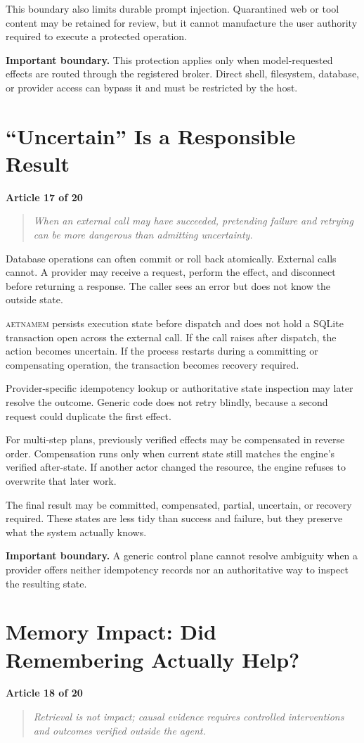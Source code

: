 \documentclass[11pt]{article}
\newcommand{\system}{\textsc{aetnamem}}
\newcommand{\articlelabel}[1]{%
  \noindent\colorbox{aetnaTeal!10}{%
    \parbox{0.96\textwidth}{\color{aetnaInk}\small\textbf{Article #1 of 20}}}%
  \par\medskip}
\newcommand{\coreidea}[1]{%
  \begin{quote}\color{aetnaTeal}\large\itshape #1\end{quote}}
\newcommand{\boundary}[1]{%
  \par\smallskip\noindent\textbf{Important boundary.} #1}
\begin{document}
This boundary also limits durable prompt injection. Quarantined web or tool
content may be retained for review, but it cannot manufacture the user
authority required to execute a protected operation.

\boundary{This protection applies only when model-requested effects are routed
through the registered broker. Direct shell, filesystem, database, or provider
access can bypass it and must be restricted by the host.}

\clearpage
\section{``Uncertain'' Is a Responsible Result}
\articlelabel{17}
\coreidea{When an external call may have succeeded, pretending failure and
retrying can be more dangerous than admitting uncertainty.}

Database operations can often commit or roll back atomically. External calls
cannot. A provider may receive a request, perform the effect, and disconnect
before returning a response. The caller sees an error but does not know the
outside state.

\system{} persists execution state before dispatch and does not hold a SQLite
transaction open across the external call. If the call raises after dispatch,
the action becomes uncertain. If the process restarts during a committing or
compensating operation, the transaction becomes recovery required.

Provider-specific idempotency lookup or authoritative state inspection may
later resolve the outcome. Generic code does not retry blindly, because a
second request could duplicate the first effect.

For multi-step plans, previously verified effects may be compensated in
reverse order. Compensation runs only when current state still matches the
engine's verified after-state. If another actor changed the resource, the
engine refuses to overwrite that later work.

The final result may be committed, compensated, partial, uncertain, or
recovery required. These states are less tidy than success and failure, but
they preserve what the system actually knows.

\boundary{A generic control plane cannot resolve ambiguity when a provider
offers neither idempotency records nor an authoritative way to inspect the
resulting state.}

\clearpage
\section{Memory Impact: Did Remembering Actually Help?}
\articlelabel{18}
\coreidea{Retrieval is not impact; causal evidence requires controlled
interventions and outcomes verified outside the agent.}
\end{document}
